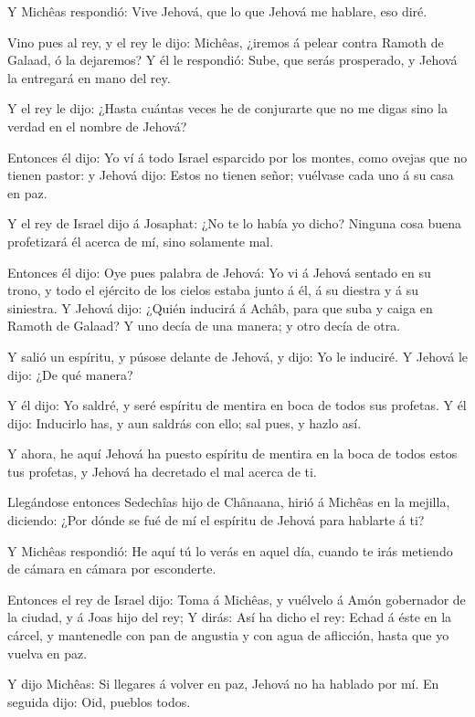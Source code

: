  Y Michêas respondió: Vive Jehová, que lo que Jehová me
hablare, eso diré.

 Vino pues al rey, y el rey le dijo: Michêas, ¿iremos á
pelear contra Ramoth de Galaad, ó la dejaremos? Y él le respondió: Sube,
que serás prosperado, y Jehová la entregará en mano del rey.

 Y el rey le dijo: ¿Hasta cuántas veces he de conjurarte
que no me digas sino la verdad en el nombre de Jehová?

 Entonces él dijo: Yo ví á todo Israel esparcido por los
montes, como ovejas que no tienen pastor: y Jehová dijo: Estos no tienen
señor; vuélvase cada uno á su casa en paz.

 Y el rey de Israel dijo á Josaphat: ¿No te lo había yo
dicho? Ninguna cosa buena profetizará él acerca de mí, sino solamente
mal.

 Entonces él dijo: Oye pues palabra de Jehová: Yo vi á
Jehová sentado en su trono, y todo el ejército de los cielos estaba
junto á él, á su diestra y á su siniestra.  Y Jehová dijo:
¿Quién inducirá á Achâb, para que suba y caiga en Ramoth de Galaad? Y
uno decía de una manera; y otro decía de otra.

 Y salió un espíritu, y púsose delante de Jehová, y dijo:
Yo le induciré. Y Jehová le dijo: ¿De qué manera?

 Y él dijo: Yo saldré, y seré espíritu de mentira en boca
de todos sus profetas. Y él dijo: Inducirlo has, y aun saldrás con ello;
sal pues, y hazlo así.

 Y ahora, he aquí Jehová ha puesto espíritu de mentira en
la boca de todos estos tus profetas, y Jehová ha decretado el mal acerca
de ti.

 Llegándose entonces Sedechîas hijo de Chânaana, hirió á
Michêas en la mejilla, diciendo: ¿Por dónde se fué de mí el espíritu de
Jehová para hablarte á ti?

 Y Michêas respondió: He aquí tú lo verás en aquel día,
cuando te irás metiendo de cámara en cámara por esconderte.

 Entonces el rey de Israel dijo: Toma á Michêas, y vuélvelo
á Amón gobernador de la ciudad, y á Joas hijo del rey;  Y
dirás: Así ha dicho el rey: Echad á éste en la cárcel, y mantenedle con
pan de angustia y con agua de aflicción, hasta que yo vuelva en paz.

 Y dijo Michêas: Si llegares á volver en paz, Jehová no ha
hablado por mí. En seguida dijo: Oid, pueblos todos.

